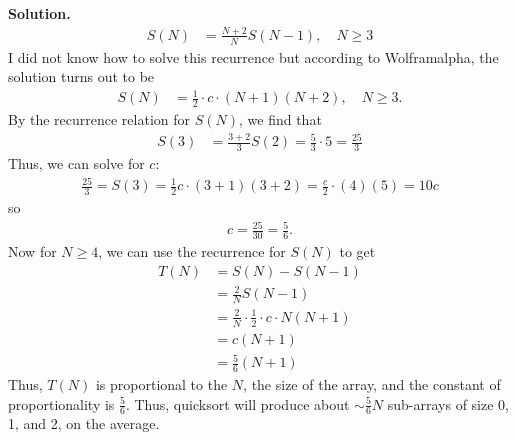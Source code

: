 \documentclass[12pt, a4paper]{article}
\newenvironment{sol}[1][Solution]
{\par\medskip\noindent \textbf{#1.} }
{\medskip}
\begin{document}
\begin{sol}
\begin{align*}
			S(N)&=\frac{N+2}{N}S(N-1),\quad N\geq 3
		\end{align*}
		I did not know how to solve this recurrence but according to
		Wolframalpha, the solution turns out to be
		\begin{align*}
			S(N)&=\frac{1}{2}\cdot c\cdot (N+1)(N+2),\quad N\geq 3.
		\end{align*}
		By the recurrence relation for $S(N)$, we find that
		\begin{align*}
			S(3) &= \frac{3+2}{3}S(2)=\frac{5}{3}\cdot 5=\frac{25}{3}
		\end{align*}
		Thus, we can solve for $c$:
		\begin{align*}
			\frac{25}{3}=S(3)=\frac{1}{2}c\cdot (3+1)(3+2)=\frac{c}{2}\cdot (4)(5)=10c
		\end{align*}
		so
		\begin{align*}
			c = \frac{25}{30}=\frac{5}{6}.
		\end{align*}
		Now for $N\geq 4$, we can use the recurrence for $S(N)$ to get
		\begin{align*}
			T(N)&=S(N)-S(N-1)\\
			&=\frac{2}{N}S(N-1)\\
			&=\frac{2}{N}\cdot \frac{1}{2}\cdot c\cdot N(N+1)\\
			&=c(N+1)\\
			&=\frac{5}{6}(N+1)
		\end{align*}
		Thus, $T(N)$ is proportional to the $N$, the size of the array, and the
		constant of proportionality is $\frac{5}{6}$. Thus, quicksort will produce
		about $\sim \frac{5}{6}N$ sub-arrays of size 0, 1, and 2, on the average.
		

\end{sol}
\end{document}
